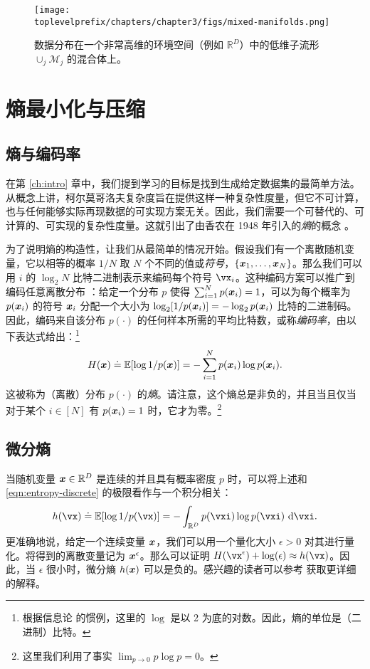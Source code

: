 \documentclass[../../book-main.tex]{subfiles}
\begin{document}
\begin{figure}
    \centering
    \texttt{[image: \\toplevelprefix/chapters/chapter3/figs/mixed-manifolds.png]}
    \caption{数据分布在一个非常高维的环境空间（例如 $\mathbb{R}^D$）中的低维子流形 $\cup_j \mathcal{M}_j$ 的混合体上。}
    \label{fig:mixture-manifolds}
\end{figure}


\section{熵最小化与压缩}

\subsection{熵与编码率}
在第 \ref{ch:intro} 章中，我们提到学习的目标是找到生成给定数据集的最简单方法。从概念上讲，柯尔莫哥洛夫复杂度旨在提供这样一种复杂性度量，但它不可计算，也与任何能够实际再现数据的可实现方案无关。因此，我们需要一个可替代的、可计算的、可实现的复杂性度量。这就引出了由香农在 1948 年引入的{\em 熵}的概念 \cite{Shannon-1948}。

为了说明熵的构造性，让我们从最简单的情况开始。假设我们有一个离散随机变量，它以相等的概率 $1/N$ 取 $N$ 个不同的值或\textit{符号}，$\{\bm{x}_1, \ldots, \bm{x}_N\}$。那么我们可以用 $i$ 的 $\log_2 N$ 比特二进制表示来编码每个符号 \(\vx_{i}\)。这种编码方案可以推广到编码任意离散分布 \cite{Cover-Thomas}：给定一个分布 \(p\) 使得 $\sum_{i=1}^N p(\bm{x}_i) = 1$，可以为每个概率为 $p(\bm{x}_i)$ 的符号 $\bm{x}_i$ 分配一个大小为 $\log_2 [1/p(\bm{x}_i)] = - \log_2 p(\bm{x}_i)$ 比特的二进制码。因此，编码来自该分布 $p(\cdot)$ 的任何样本所需的平均比特数，或称{\em 编码率}，由以下表达式给出：\footnote{根据信息论 \cite{Cover-Thomas} 的惯例，这里的 $\log$ 是以 2 为底的对数。因此，熵的单位是（二进制）比特。}
\begin{equation}
	H(\bm{x}) \doteq \mathbb{E}[\log 1/p(\bm{x})]  = - \sum_{i=1}^N p(\bm{x}_i) \log  p(\bm{x}_i).
	\label{eqn:entropy-discrete}
\end{equation}
这被称为（离散）分布 $p(\cdot)$ 的{\em 熵}。请注意，这个熵总是非负的，并且当且仅当对于某个 $i \in [N]$ 有 $p(\bm{x}_i) = 1$ 时，它才为零。\footnote{这里我们利用了事实 $\lim_{p\rightarrow 0} p \log p = 0$。}


\subsection{微分熵}

当随机变量 $\bm{x} \in \mathbb{R}^{D}$ 是连续的并且具有概率密度 $p$ 时，可以将上述和 \eqref{eqn:entropy-discrete} 的极限看作与一个积分相关：
\begin{equation}
	h(\vx) \doteq \Ex[\log 1/p(\vx)] = - \int_{\R^{D}} p(\vxi) \log p(\vxi) \odif{\vxi}.
	\label{eqn:entropy-differential}
\end{equation}
{更准确地说，给定一个连续变量 $\bm{x}$，我们可以用一个量化大小 $\epsilon > 0$ 对其进行量化。将得到的离散变量记为 $\bm{x}^\epsilon$。那么可以证明 $H(\vx^\epsilon) + \log(\epsilon) \approx h(\vx)$。因此，当 $\epsilon$ 很小时，微分熵 $h(\bm{x})$ 可以是负的。感兴趣的读者可以参考 \cite{Cover-Thomas} 获取更详细的解释。}
\end{document}
